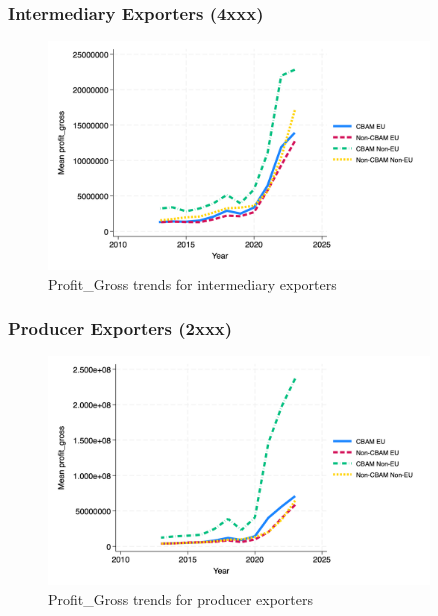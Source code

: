 \documentclass{article}
\begin{document}
\subsubsection{Intermediary Exporters (4xxx)}
\begin{figure}[h!]
\centering
\includegraphics[width=0.9\textwidth]{profit_gross_ei.png}
\caption{Profit_Gross trends for intermediary exporters}
\label{fig:profit_gross_ei}
\end{figure}

\subsubsection{Producer Exporters (2xxx)}
\begin{figure}[h!]
\centering
\includegraphics[width=0.9\textwidth]{profit_gross_ep.png}
\caption{Profit_Gross trends for producer exporters}
\label{fig:profit_gross_ep}
\end{figure}
\end{document}
